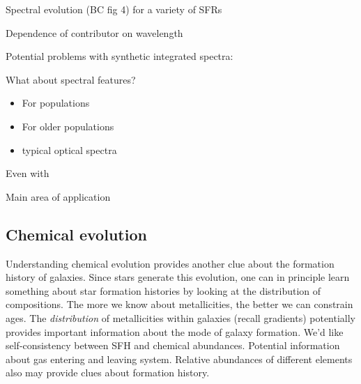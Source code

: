 \documentclass{article}
\begin{document}
Spectral evolution (BC fig 4) for a variety of SFRs

Dependence of contributor on wavelength

Potential problems with synthetic integrated spectra:

What about spectral features?
\begin{itemize}
    \item For populations
    \item For older populations
    \item typical optical spectra
\end{itemize}

Even with

Main area of application





\subsection{Chemical evolution}
Understanding chemical evolution provides another clue about
the formation history of galaxies. Since stars generate this evolution,
one can in principle learn something about star formation histories by
looking at the distribution of compositions. The more we know about
metallicities, the better we can constrain ages. The \emph{distribution}
of metallicities within galaxies (recall gradients) potentially provides
important information about the mode of galaxy formation.
We'd like self-consistency between SFH and chemical abundances.
Potential information about gas entering and leaving system. Relative abundances of different
elements also may provide clues about formation history.
\end{document}
